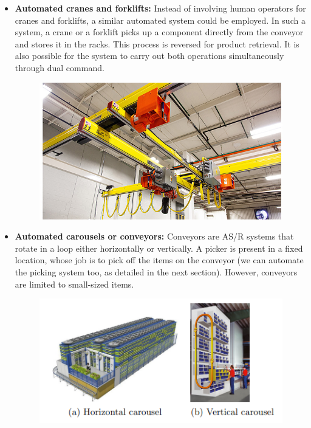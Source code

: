 \documentclass{report}
\begin{document}
\begin{itemize}
    \item \textbf{Automated cranes and forklifts:}
Instead of involving human operators for cranes and forklifts, a similar automated system could be employed. In such a system, a crane or a forklift picks up a component directly from the conveyor and stores it in the racks. This process is reversed for product retrieval. It is also possible for the system to carry out both operations simultaneously through dual command.

\begin{figure}[H]
    
    \centering
    \includegraphics[scale=0.3]{crane.png}
    \caption{}
    
\end{figure}

\item {\bfseries Automated carousels or conveyors:}
Conveyors are AS/R systems that rotate in a loop either horizontally or vertically. A picker is present in a fixed location, whose job is to pick off the items on the conveyor (we can automate the picking system too, as detailed in the next section). However, conveyors are limited to small-sized items. 

\begin{figure}[H]
    
    \centering
    \includegraphics[scale=0.7]{carousel}
    \caption{}
    

\end{figure}
\end{itemize}
\end{document}
